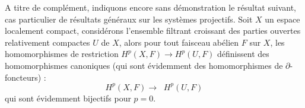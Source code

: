 A titre de complément, indiquons encore sans démonstration le résultat
suivant, cas particulier de résultats généraux sur les systèmes projectifs.
Soit $X$ un espace localement compact, considérons l'ensemble filtrant
croissant des parties ouvertes relativement compactes $U$ de $X$, alors pour
tout faisceau abélien $F$ sur $X$, les homomorphismes de restriction
$H^p(X,F)\to H^p(U,F)$ définissent des homomorphismes canoniques
(qui sont évidemment des homomorphismes de $\partial$-foncteurs) :
\[
\tag{3.10.2}
H^p(X,F)\to\mathop{\underset{\leftarrow}{\lim}} H^p(U,F)
\]
qui sont évidemment bijectifs pour $p=0$.

